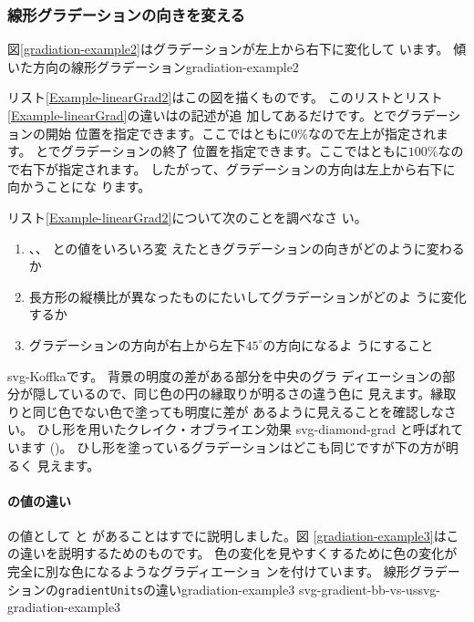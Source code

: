 \subsubsection{線形グラデーションの向きを変える}
図\ref{gradiation-example2}はグラデーションが左上から右下に変化して
います。
    {傾いた方向の線形グラデーション}{gradiation-example2}

リスト\ref{Example-linearGrad2}はこの図を描くものです。
このリストとリスト\ref{Example-linearGrad}の違いはの記述が追
加してあるだけです。とでグラデーションの開始
位置を指定できます。ここではともに$0\%$なので左上が指定されます。
とでグラデーションの終了
位置を指定できます。ここではともに$100\%$なので右下が指定されます。
したがって、グラデーションの方向は左上から右下に向かうことにな
ります。
\begin{Problem}\upshape
リスト\ref{Example-linearGrad2}について次のことを調べなさ い。
\begin{enumerate}
 \item  {}、、 との値をいろいろ変
 えたときグラデーションの向きがどのように変わるか
 \item 長方形の縦横比が異なったものにたいしてグラデーションがどのよ
       うに変化するか
 \item グラデーションの方向が右上から左下$45^{\circ}$の方向になるよ
       うにすること
\end{enumerate}
\end{Problem}
{svg-Koffka}{です。
背景の明度の差がある部分を中央のグラ
ディエーションの部分が隠しているので、同じ色の円の縁取りが明るさの違う色に
見えます。縁取りと同じ色でない色で塗っても明度に差が
あるように見えることを確認しなさい。}
{ひし形を用いたクレイク・オブライエン効果}
{svg-diamond-grad}
{と呼ばれています
(\cite[58ページ図6.4]{Ninio})。
ひし形を塗っているグラデーションはどこも同じですが下の方が明るく
見えます。}
\paragraph{の値の違い}\label{diff-gradientUnits}
の値として と
があることはすでに説明しました。図
\ref{gradiation-example3}はこの違いを説明するためのものです。
%
色の変化を見やすくするために色の変化が完全に別な色になるようなグラディエーショ
ンを付けています。
    {線形グラデーションの\protect\texttt{gradientUnits}の違い}{gradiation-example3}
{svg-gradient-bb-vs-us}{svg-gradiation-example3}{}

